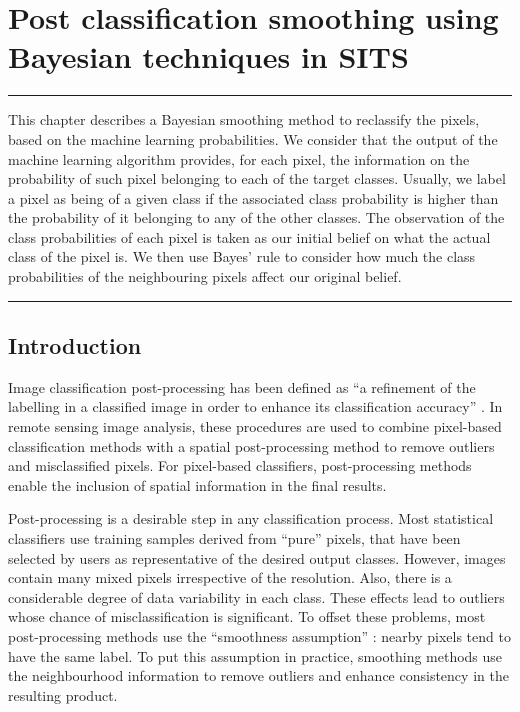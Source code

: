 \documentclass[a4paper,]{tufte-book}
\begin{document}
\hypertarget{post-classification-smoothing-using-bayesian-techniques-in-sits}{%
\chapter{Post classification smoothing using Bayesian techniques in SITS}\label{post-classification-smoothing-using-bayesian-techniques-in-sits}}

\begin{center}\rule{0.5\linewidth}{0.5pt}\end{center}

This chapter describes a Bayesian smoothing method to reclassify the pixels,
based on the machine learning probabilities. We consider that the output of the
machine learning algorithm provides, for each pixel, the information on the probability
of such pixel belonging to each of the target classes. Usually, we label a pixel
as being of a given class if the associated class probability is higher than the
probability of it belonging to any of the other classes. The observation of the
class probabilities of each pixel is taken as our initial belief on what the actual
class of the pixel is. We then use Bayes' rule to consider how much the class probabilities
of the neighbouring pixels affect our original belief.

\begin{center}\rule{0.5\linewidth}{0.5pt}\end{center}

\hypertarget{introduction-1}{%
\section{Introduction}\label{introduction-1}}

Image classification post-processing has been defined as ``a refinement of the labelling in a classified image in order to enhance its classification accuracy'' \citep{Huang2014}. In remote sensing image analysis, these procedures are used to combine pixel-based classification methods with a spatial post-processing method to remove outliers and misclassified pixels. For pixel-based classifiers, post-processing methods enable the inclusion of spatial information in the final results.

Post-processing is a desirable step in any classification process. Most statistical classifiers use training samples derived from ``pure'' pixels, that have been selected by users as representative of the desired output classes. However, images contain many mixed pixels irrespective of the resolution. Also, there is a considerable degree of data variability in each class. These effects lead to outliers whose chance of misclassification is significant. To offset these problems, most post-processing methods use the ``smoothness assumption'' \citep{Schindler2012}: nearby pixels tend to have the same label. To put this assumption in practice, smoothing methods use the neighbourhood information to remove outliers and enhance consistency in the resulting product.
\end{document}

